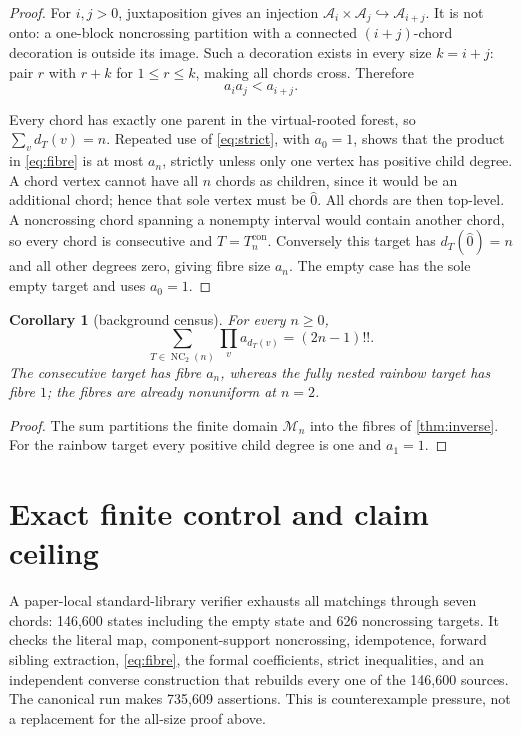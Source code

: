 \documentclass[10pt,a4paper]{amsart}
\newtheorem{corollary}[theorem]{Corollary}
\theoremstyle{definition}
\theoremstyle{remark}
\newcommand{\M}{\mathcal M}
\newcommand{\NC}{\operatorname{NC}}
\begin{document}
\begin{proof}
For $i,j>0$, juxtaposition gives an injection
$\mathcal A_i\times\mathcal A_j\hookrightarrow\mathcal A_{i+j}$.  It is
not onto: a one-block noncrossing partition with a connected
$(i+j)$-chord decoration is outside its image.  Such a decoration exists
in every size $k=i+j$: pair $r$ with $r+k$ for $1\le r\le k$, making all
chords cross.  Therefore
\begin{equation}
                         a_i a_j<a_{i+j}.                \label{eq:strict}
\end{equation}

Every chord has exactly one parent in the virtual-rooted forest, so
$\sum_v d_T(v)=n$.  Repeated use of \eqref{eq:strict}, with $a_0=1$, shows
that the product in \eqref{eq:fibre} is at most $a_n$, strictly unless only
one vertex has positive child degree.  A chord vertex cannot have all $n$
chords as children, since it would be an additional chord; hence that sole
vertex must be $\widehat0$.  All chords are then top-level.  A noncrossing
chord spanning a nonempty interval would contain another chord, so every
chord is consecutive and $T=T_n^{\mathrm{con}}$.  Conversely this target
has $d_T(\widehat0)=n$ and all other degrees zero, giving fibre size $a_n$.
The empty case has the sole empty target and uses $a_0=1$.
\end{proof}

\begin{corollary}[background census]\label{cor:census}
For every $n\ge0$,
\[
 \sum_{T\in\NC_2(n)}\prod_v a_{d_T(v)}=(2n-1)!!.
\]
The consecutive target has fibre $a_n$, whereas the fully nested rainbow
target has fibre $1$; the fibres are already nonuniform at $n=2$.
\end{corollary}

\begin{proof}
The sum partitions the finite domain $\M_n$ into the fibres of \cref{thm:inverse}.
For the rainbow target every positive child degree is one and $a_1=1$.
\end{proof}

\section{Exact finite control and claim ceiling}

A paper-local standard-library verifier exhausts all matchings through seven
chords: 146,600 states including the empty state and 626 noncrossing
targets.  It checks the literal map, component-support noncrossing,
idempotence, forward sibling extraction, \eqref{eq:fibre}, the formal
coefficients, strict inequalities, and an independent converse construction
that rebuilds every one of the 146,600 sources.  The canonical run makes
735,609 assertions.  This is counterexample pressure, not a replacement for
the all-size proof above.
\end{document}
